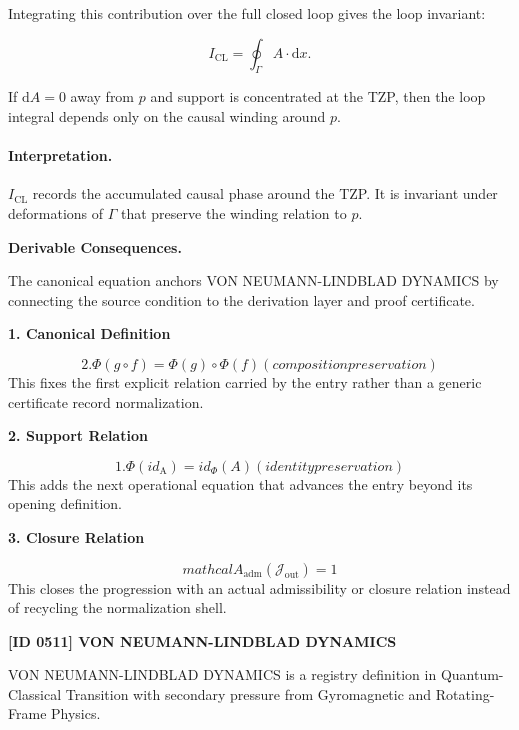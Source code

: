 Integrating this contribution over the full closed loop gives the loop invariant:

\begin{equation}
I_{\mathrm{CL}}
=
\oint_{\Gamma} A\cdot \mathrm{d}x .
\end{equation}

If $\mathrm{d}A=0$ away from $p$ and support is concentrated at the TZP, then the loop integral depends only on the causal winding around $p$.

\paragraph{Interpretation.}
$I_{\mathrm{CL}}$ records the accumulated causal phase around the TZP. It is invariant under deformations of $\Gamma$ that preserve the winding relation to $p$.

\par\vspace{0.35em}
\noindent\textbf{Derivable Consequences.}\quad
\begingroup
\footnotesize
\raggedright
The canonical equation anchors VON NEUMANN-LINDBLAD DYNAMICS by connecting the source condition to the derivation layer and proof certificate.
\par\endgroup

\noindent\textbf{1. Canonical Definition}\par
\[
2. \Phi(g \circ f) = \Phi(g) \circ \Phi(f) (composition preservation)
\]
\noindent This fixes the first explicit relation carried by the entry rather than a generic certificate record normalization.\par
\noindent\textbf{2. Support Relation}\par
\[
1. \Phi(id_{\mathrm{A}}) = id_\Phi(A) (identity preservation)
\]
\noindent This adds the next operational equation that advances the entry beyond its opening definition.\par
\noindent\textbf{3. Closure Relation}\par
\[
mathcal{A}_{\mathrm{adm}}\!\left(\mathcal{J}_{\mathrm{out}}\right)=1
\]
\noindent This closes the progression with an actual admissibility or closure relation instead of recycling the normalization shell.\par

\clearpage
\noindent\textbf{[ID 0511] VON NEUMANN-LINDBLAD DYNAMICS}\par
\vspace{0.35em}
\begingroup\small
{}
VON NEUMANN-LINDBLAD DYNAMICS is a registry definition in Quantum-Classical Transition with secondary pressure from Gyromagnetic and Rotating-Frame Physics.

